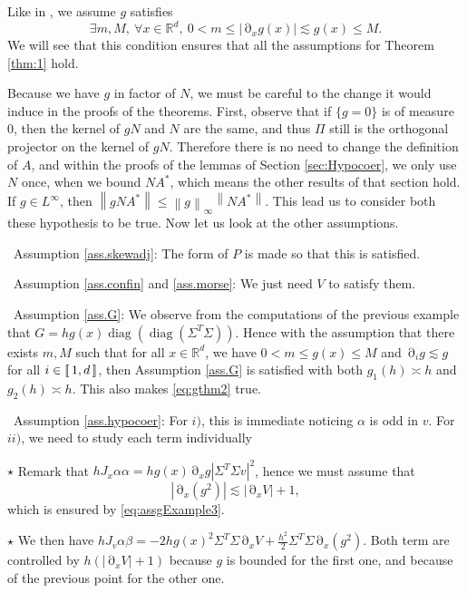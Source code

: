 \documentclass[12pt]{amsart}
\newcommand{\diag}{\operatorname{diag}}
\newcommand{\R}{\mathbb R}
\numberwithin{equation}{section}
\numberwithin{figure}{section}
\DeclareMathOperator{\p}{\partial}
\newcommand{\vvert}[1]{\left\lVert#1\right\rVert}
\newcommand{\lb}{\operatorname{[\negthinspace [}}
\newcommand{\rb}{\operatorname{]\negthinspace ]}}
\begin{document}
Like in \cite{LeLeLaHi24}, we assume $g$ satisfies
\begin{equation}\label{eq:assgExample3}
\exists m,M,\ \forall x\in\R^d,\ 0 < m \leq |\p_xg(x)| \lesssim g(x) \leq M.
\end{equation}
We will see that this condition ensures that all the assumptions for Theorem \ref{thm:1} hold.

Because we have $g$ in factor of $N$, we must be careful to the change it would induce in the proofs of the theorems. First, observe that if $\{g = 0\}$ is of measure $0$, then the kernel of $gN$ and $N$ are the same, and thus $\Pi$ still is the orthogonal projector on the kernel of $gN$. Therefore there is no need to change the definition of $A$, and within the proofs of the lemmas of Section \ref{sec:Hypocoer}, we only use $N$ once, when we bound $NA^*$, which means the other results of that section hold. If $g\in L^\infty$, then $\vvert{gNA^*} \leq \vvert{g}_\infty \vvert{NA^*}$. This lead us to consider both these hypothesis to be true. Now let us look at the other assumptions.

\textbullet\ Assumption \ref{ass.skewadj}: The form of $P$ is made so that this is satisfied.

\textbullet\ Assumption \ref{ass.confin} and \ref{ass.morse}: We just need $V$ to satisfy them.

\textbullet\ Assumption \ref{ass.G}: We observe from the computations of the previous example that $G = hg(x)\diag(\diag(\Sigma^T\Sigma))$. Hence with the assumption that there exists $m,M$ such that for all $x\in\R^d$, we have $0<m\leq g(x)\leq M$ and $\p_ig \lesssim g$ for all $i\in\lb1,d\rb$, then Assumption \ref{ass.G} is satisfied with both $g_1(h)\asymp h$ and $g_2(h)\asymp h$. This also makes \eqref{eq:gthm2} true.

\textbullet\ Assumption \ref{ass.hypocoer}: For $i)$, this is immediate noticing $\alpha$ is odd in $v$. For $ii)$, we need to study each term individually

\quad $\star$ Remark that $hJ_x\alpha\alpha = hg(x)\p_xg|\Sigma^T\Sigma v|^2$, hence we must assume that
\begin{equation*}
|\p_x(g^2)| \lesssim |\p_x V| + 1,
\end{equation*}
which is ensured by \eqref{eq:assgExample3}.

\quad $\star$ We then have $hJ_v\alpha\beta = -2hg(x)^2\Sigma^T\Sigma\p_xV + \frac{h^2}2\Sigma^T\Sigma\p_x(g^2)$. Both term are controlled by $h(|\p_xV| + 1)$ because $g$ is bounded for the first one, and because of the previous point for the other one.
\end{document}
